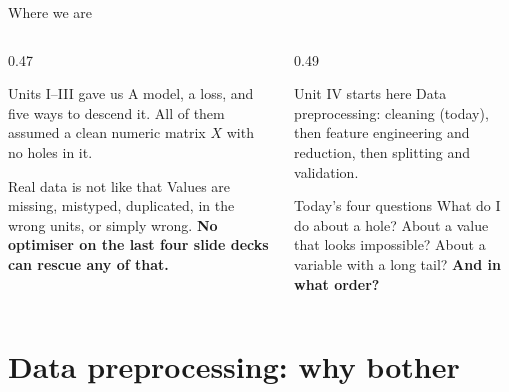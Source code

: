 \documentclass[aspectratio=169]{beamer}
\begin{document}
\begin{frame}[shrink=5]{Where we are}
  \begin{columns}[T]
    \begin{column}{0.47\textwidth}
      \begin{block}{Units I--III gave us}
        A model, a loss, and five ways to descend it. All of them assumed a
        clean numeric matrix $X$ with no holes in it.
      \end{block}
      \begin{block}{Real data is not like that}
        Values are missing, mistyped, duplicated, in the wrong units, or
        simply wrong. \textbf{No optimiser on the last four slide decks can
        rescue any of that.}
      \end{block}
    \end{column}
    \begin{column}{0.49\textwidth}
      \begin{exampleblock}{Unit IV starts here}
        Data preprocessing: cleaning (today), then feature engineering and
        reduction, then splitting and validation.
      \end{exampleblock}
      \begin{alertblock}{Today's four questions}
        What do I do about a hole? About a value that looks impossible? About
        a variable with a long tail? \textbf{And in what order?}
      \end{alertblock}
    \end{column}
  \end{columns}
\end{frame}

\section[Why clean]{Data preprocessing: why bother}
\label{sec:why}
\end{document}
